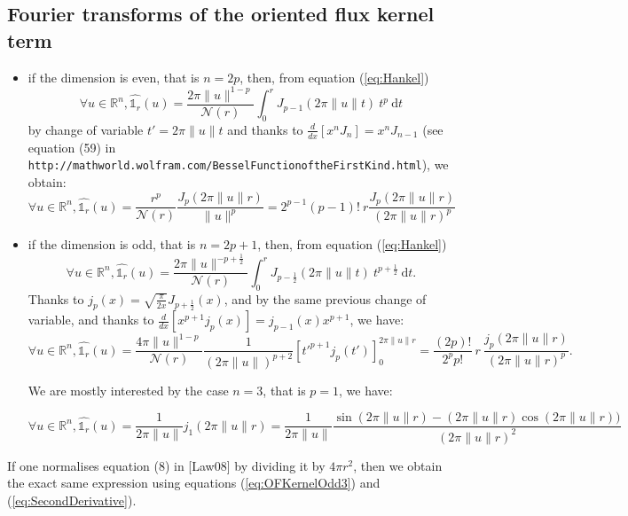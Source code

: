 \documentclass[11pt]{amsart}
\begin{document}
\subsection{Fourier transforms of the oriented flux kernel term}
\begin{itemize}
\item if the dimension is even, that is $n = 2p$, then, from equation (\ref{eq:Hankel})
\begin{equation}\label{eq:OFKernelEven}
\forall u\in\mathbb{R}^n,  \widehat{\mathds{1}_r} (u) = \frac{2\pi \|u\|^{1-p}}{\mathcal{N}(r)}  \int_0^r J_{p-1}(2\pi \|u\| t) ~t^{p} ~\mathrm{d}t
\end{equation}
by change of variable $t' = 2\pi \|u\| t$ and thanks to $\frac{d}{dx}\left[x^n J_n\right] = x^n J_{n-1}$ (see equation (59) in \texttt{http://mathworld.wolfram.com/BesselFunctionoftheFirstKind.html}), we obtain:
\begin{equation}\label{eq:OFKernelEven2}
\forall u\in\mathbb{R}^n,  \widehat{\mathds{1}_r} (u) = \frac{r^p}{\mathcal{N}(r)}\frac{J_p(2\pi \|u\|r)}{\|u\|^p} =2^{p-1} (p-1)!~ r   \frac{J_p(2\pi \|u\|r)}{(2\pi \|u\|r)^p}
\end{equation}
\item if the dimension is odd, that is $n = 2p+1$, then, from equation (\ref{eq:Hankel})
\begin{equation}\label{eq:OFKernelOdd}
\forall u\in\mathbb{R}^n,  \widehat{\mathds{1}_r} (u) = \frac{2\pi \|u\|^{-p+\frac{1}{2}}}{\mathcal{N}(r)}  \int_0^r J_{p-\frac{1}{2}}(2\pi \|u\| t) ~t^{p+\frac{1}{2}} ~\mathrm{d}t.
\end{equation}
Thanks to $j_p(x) = \sqrt{\frac{\pi}{2 x}}J_{p+\frac{1}{2}}(x)$, and by the same previous change of variable, and thanks to $\frac{d}{dx}[x^{p+1}j_p(x)] = j_{p-1}(x)x^{p+1}$, we have:
\begin{equation}\label{eq:OFKernelOdd2}
\forall u\in\mathbb{R}^n,  \widehat{\mathds{1}_r} (u)  = \frac{4\pi \|u\|^{1-p}}{\mathcal{N}(r)} \frac{1}{(2\pi\|u\|)^{p+2}} [t'^{p+1} j_p(t')]_0^{2\pi \|u\|r} = \frac{(2p)!}{2^p p!} ~r~ \frac{j_p(2\pi \|u\|r)}{(2\pi \|u\|r)^p}.
\end{equation}

We are mostly interested by the case $n=3$, that is $p=1$, we have:

\begin{equation}\label{eq:OFKernelOdd3}
\forall u\in\mathbb{R}^n,  \widehat{\mathds{1}_r} (u)  = \frac{1}{2\pi \|u\|} j_1(2\pi \|u\|r)=\frac{1}{2\pi \|u\|}  \frac{\sin(2\pi \|u\|r) -(2\pi \|u\|r) \cos(2\pi \|u\|r))}{(2\pi \|u\|r)^2}
\end{equation}
\end{itemize}
If one normalises  equation (8) in [Law08] by dividing it by $4\pi r^2$, then we obtain the exact same expression using equations (\ref{eq:OFKernelOdd3}) and (\ref{eq:SecondDerivative}).
\end{document}
